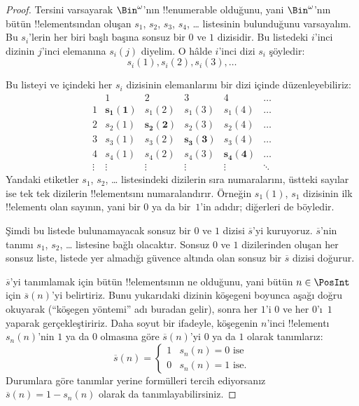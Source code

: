 \documentclass[../../../include/open-logic-section]{subfiles}
\begin{document}
\begin{proof}
Tersini varsayarak $\Bin^\omega$'nın !!{enumerable} olduğunu, yani
$\Bin^\omega$'nın bütün !!{element}s{}ından oluşan $s_1$, $s_2$, $s_3$,
$s_4$, \dots{} listesinin bulunduğunu varsayalım. Bu $s_i$'lerin her biri
başlı başına sonsuz bir $0$ ve $1$ dizisidir. Bu listedeki $i$'inci dizinin
$j$'inci elemanına $s_i(j)$ diyelim. O hâlde $i$'inci dizi $s_i$ şöyledir:
\[
s_i(1), s_i(2), s_i(3), \dots
\]

Bu listeyi ve içindeki her $s_i$ dizisinin elemanlarını bir dizi içinde
düzenleyebiliriz:
\[
\begin{array}{c|c|c|c|c|c}
& 1 & 2 & 3 & 4 & \dots \\\hline
1 & \mathbf{s_{1}(1)} & s_{1}(2) & s_{1}(3) & s_1(4) & \dots \\\hline
2 & s_{2}(1)& \mathbf{s_{2}(2)} & s_2(3) & s_2(4) & \dots \\\hline
3 & s_{3}(1)& s_{3}(2) & \mathbf{s_3(3)} & s_3(4) & \dots \\\hline
4 & s_{4}(1)& s_{4}(2) & s_4(3) & \mathbf{s_4(4)} & \dots \\\hline
\vdots & \vdots & \vdots & \vdots & \vdots & \mathbf{\ddots}
\end{array}
\]
Yandaki etiketler $s_1$, $s_2$, \dots{} listesindeki dizilerin sıra numaralarını,
üstteki sayılar ise tek tek dizilerin !!{element}s{}ını numaralandırır.
Örneğin $s_1(1)$, $s_1$ dizisinin ilk !!{element}{}ı olan sayının, yani bir
$0$ ya da bir~$1$'in adıdır; diğerleri de böyledir.

Şimdi bu listede bulunamayacak sonsuz bir $0$ ve $1$ dizisi
$\overline{s}$'yi kuruyoruz. $\overline{s}$'nin tanımı $s_1$, $s_2$,
\dots{} listesine bağlı olacaktır. Sonsuz $0$ ve $1$ dizilerinden oluşan her
sonsuz liste, listede yer almadığı güvence altında olan sonsuz bir
$\overline{s}$ dizisi doğurur.

$\overline{s}$'yi tanımlamak için bütün !!{element}s{}ının ne olduğunu, yani
bütün $n\in\PosInt$ için $\overline{s}(n)$'yi belirtiriz. Bunu yukarıdaki
dizinin köşegeni boyunca aşağı doğru okuyarak (``köşegen yöntemi'' adı buradan
gelir), sonra her $1$'i $0$ ve her $0$'ı~$1$ yaparak gerçekleştiririz. Daha
soyut bir ifadeyle, köşegenin $n$'inci !!{element}{}ı $s_n(n)$'nin $1$ ya da
$0$ olmasına göre $\overline{s}(n)$'yi $0$ ya da $1$ olarak tanımlarız:
\[
\overline{s}(n) =
\begin{cases}
1 & \text{$s_{n}(n) = 0$ ise}\\
0 & \text{$s_{n}(n) = 1$ ise.}
\end{cases}
\]
Durumlara göre tanımlar yerine formülleri tercih ediyorsanız
$\overline{s}(n)=1-s_n(n)$ olarak da tanımlayabilirsiniz.


\end{proof}
\end{document}
